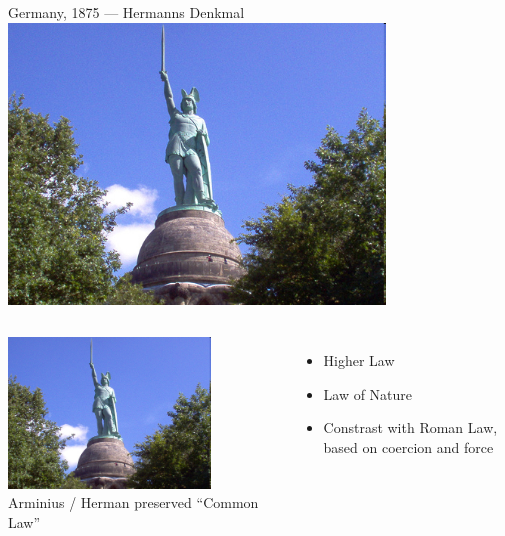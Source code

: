 \begin{frame}{Germany, 1875 --- Hermanns Denkmal}
    \centering
    \includegraphics[width=0.75\textwidth]{img/herman2.png} \\
\end{frame}

\begin{frame}
    \begin{columns}[onlytextwidth]
            \centering
            \includegraphics[width=0.75\textwidth]{img/herman2.png} \\

            Arminius / Herman preserved ``Common Law''
            \pause
            \begin{itemize}
                \item Higher Law
                \pause
                \item Law of Nature
                \pause
                \item Constrast with Roman Law, based on coercion and force
            \end{itemize}
    \end{columns}
\end{frame}

